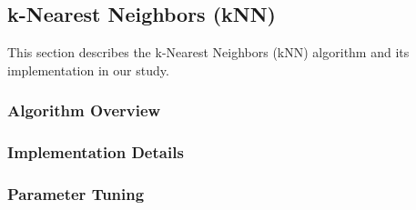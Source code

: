 \subsection{k-Nearest Neighbors (kNN)}
\label{subsec:methods-knn}

This section describes the k-Nearest Neighbors (kNN) algorithm and its implementation in our study.


\subsubsection{Algorithm Overview}

\subsubsection{Implementation Details}

\subsubsection{Parameter Tuning}

